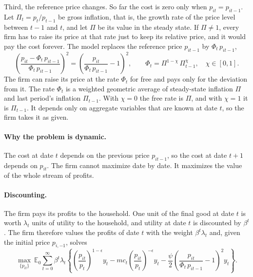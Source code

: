 \documentclass[11pt]{article}
\begin{document}
Third, the reference price changes. So far the cost is zero only when $p_{it} = p_{it-1}$. Let $\Pi_t = p_t/p_{t-1}$ be gross inflation, that is, the growth rate of the price level between $t-1$ and $t$, and let $\Pi$ be its value in the steady state. If $\Pi \ne 1$, every firm has to raise its price at that rate just to keep its relative price, and it would pay the cost forever. The model replaces the reference price $p_{it-1}$ by $\Phi_t\, p_{it-1}$,
\begin{equation*}
\left( \frac{p_{it} - \Phi_t\, p_{it-1}}{\Phi_t\, p_{it-1}} \right)^2 = \left( \frac{p_{it}}{\Phi_t\, p_{it-1}} - 1 \right)^2 ,
\qquad
\Phi_t = \Pi^{1-\chi}\, \Pi_{t-1}^{\chi} , \quad \chi \in [0,1] .
\end{equation*}
The firm can raise its price at the rate $\Phi_t$ for free and pays only for the deviation from it. The rate $\Phi_t$ is a weighted geometric average of steady-state inflation $\Pi$ and last period's inflation $\Pi_{t-1}$. With $\chi = 0$ the free rate is $\Pi$, and with $\chi = 1$ it is $\Pi_{t-1}$. It depends only on aggregate variables that are known at date $t$, so the firm takes it as given.

\paragraph{Why the problem is dynamic.} The cost at date $t$ depends on the previous price $p_{it-1}$, so the cost at date $t+1$ depends on $p_{it}$. The firm cannot maximize date by date. It maximizes the value of the whole stream of profits.

\paragraph{Discounting.} The firm pays its profits to the household. One unit of the final good at date $t$ is worth $\lambda_t$ units of utility to the household, and utility at date $t$ is discounted by $\beta^t$. The firm therefore values the profits of date $t$ with the weight $\beta^t \lambda_t$ and, given the initial price $p_{i,-1}$, solves
\begin{equation*}
\max_{\{p_{it}\}} \ \mathbb{E}_0 \sum_{t=0}^{\infty} \beta^t \lambda_t \left\{ \left( \frac{p_{it}}{p_t} \right)^{1-\epsilon} y_t - mc_t \left( \frac{p_{it}}{p_t} \right)^{-\epsilon} y_t - \frac{\psi}{2} \left( \frac{p_{it}}{\Phi_t\, p_{it-1}} - 1 \right)^2 y_t \right\} .
\end{equation*}
\end{document}
